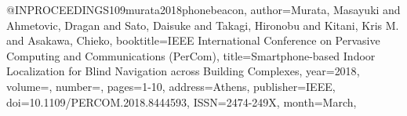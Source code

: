 @INPROCEEDINGS{109murata2018phonebeacon,
author={Murata, Masayuki and Ahmetovic, Dragan and Sato, Daisuke and Takagi, Hironobu and Kitani, Kris M. and Asakawa, Chieko},
booktitle={IEEE International Conference on Pervasive Computing and Communications (PerCom)}, 
title={Smartphone-based Indoor Localization for Blind Navigation across Building Complexes}, 
year={2018},
volume={},
number={},
pages={1-10},
address={Athens},
publisher={IEEE},
doi={10.1109/PERCOM.2018.8444593},
ISSN={2474-249X},
month={March},}